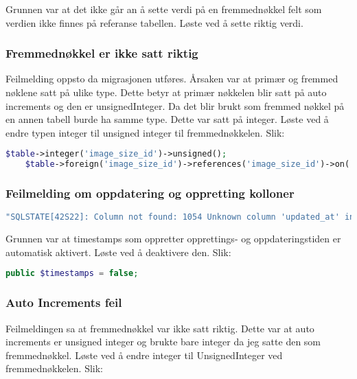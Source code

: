 Grunnen var at det ikke går an å sette verdi på en fremmednøkkel felt som verdien ikke finnes på referanse tabellen. Løste ved å sette riktig verdi.

\subsubsection{Fremmednøkkel er ikke satt riktig}
Feilmelding oppsto da migrasjonen utføres. 
Årsaken var at primær og fremmed nøklene satt på ulike type.
Dette betyr at primær nøkkelen blir satt på auto increments og den er unsignedInteger. Da det blir brukt som fremmed nøkkel på en annen tabell burde ha samme type. Dette var satt på integer.
Løste ved å endre typen integer til unsigned integer til fremmednøkkelen. Slik:

\begin{lstlisting}[language=PHP]
    $table->integer('image_size_id')->unsigned();
    $table->foreign('image_size_id')->references('image_size_id')->on('image_sizes');
\end{lstlisting}

\subsubsection{Feilmelding om oppdatering og oppretting kolloner}
\begin{lstlisting}[language=PHP]
    "SQLSTATE[42S22]: Column not found: 1054 Unknown column 'updated_at' in 'field list' (SQL: insert into `image_sizes` (`name`, `max_width`, `max_height`, `id`, `updated_at`, `created_at`) values (size-name, 10, 20, 879d1360-9a74-46f8-b383-ff6ec6e0f387, 2019-02-07 21:08:09, 2019-02-07 21:08:09))
\end{lstlisting}
Grunnen var at timestamps som oppretter opprettings- og oppdateringstiden er automatisk aktivert.
Løste ved å deaktivere den. Slik: 

\begin{lstlisting}[language=PHP]
    public $timestamps = false;
\end{lstlisting}

\subsubsection{Auto Increments feil}
Feilmeldingen sa at fremmednøkkel var ikke satt riktig.
Dette var at auto increments er unsigned integer og brukte bare integer da jeg satte den som fremmednøkkel.
Løste ved å endre integer til UnsignedInteger ved fremmednøkkelen. Slik:

